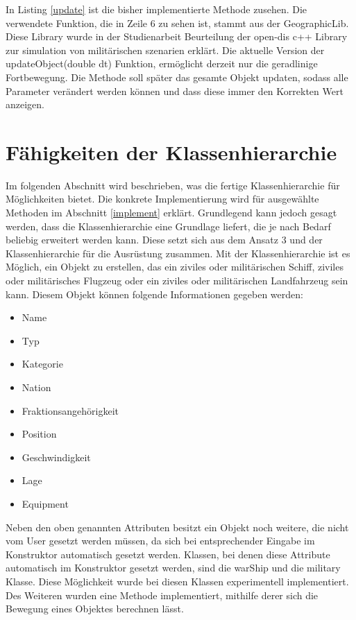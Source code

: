  In  Listing \ref{update} ist die bisher implementierte Methode zusehen. Die verwendete Funktion, die in Zeile 6 zu sehen ist, stammt aus der GeographicLib. Diese Library wurde in der Studienarbeit \glqq Beurteilung der open-dis c++ Library zur simulation von militärischen szenarien\grqq{} \cite{HenryWinkel.} erklärt. Die aktuelle Version der  \glqq updateObject(double dt) \grqq{} Funktion, ermöglicht derzeit nur die geradlinige Fortbewegung. Die Methode soll später das gesamte Objekt updaten, sodass alle Parameter verändert werden können und dass diese immer den Korrekten Wert anzeigen.
 
 \section{Fähigkeiten der Klassenhierarchie}
Im folgenden Abschnitt wird beschrieben, was die fertige Klassenhierarchie für Möglichkeiten bietet. Die konkrete Implementierung wird für ausgewählte Methoden im Abschnitt \ref{implement} erklärt.
Grundlegend kann jedoch gesagt werden, dass die Klassenhierarchie eine Grundlage liefert, die je nach Bedarf beliebig erweitert werden kann.
Diese setzt sich aus dem Ansatz 3 und der Klassenhierarchie für die Ausrüstung zusammen. 
Mit der Klassenhierarchie ist es Möglich, ein Objekt zu erstellen, das ein ziviles oder militärischen Schiff, ziviles oder militärisches Flugzeug oder ein ziviles oder militärischen Landfahrzeug sein kann. Diesem Objekt können folgende Informationen gegeben werden:
\begin{itemize}
	\singlespacing
	\item Name
	\item Typ
	\item Kategorie
	\item Nation
	\item Fraktionsangehörigkeit
	\item Position
	\item Geschwindigkeit
	\item Lage
	\item Equipment
\end{itemize}
Neben den oben genannten Attributen besitzt ein Objekt noch weitere, die nicht vom User gesetzt werden müssen, da sich bei entsprechender Eingabe im Konstruktor automatisch gesetzt werden. Klassen, bei denen diese Attribute automatisch im Konstruktor gesetzt werden, sind die \glqq warShip\grqq{} und die \glqq military\grqq{} Klasse. Diese Möglichkeit wurde bei diesen Klassen experimentell implementiert.
Des Weiteren wurden eine Methode implementiert, mithilfe derer sich die Bewegung eines Objektes berechnen lässt. \\
